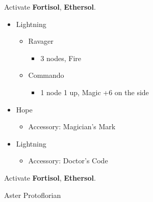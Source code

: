 \begin{paracol}{2}
\begin{menu}
\begin{itemize}
		\end{itemize}
	\end{menu}
	Activate \textbf{Fortisol}, \textbf{Ethersol}.
	\switchcolumn
	\begin{menu}
		\begin{itemize}
			\crystarium
			\begin{itemize}
				\item Lightning
				      \begin{itemize}
					      \item Ravager
					            \begin{itemize}
						            \item 3 nodes, Fire
					            \end{itemize}
					      \item Commando
					            \begin{itemize}
						            \item 1 node 1 up, Magic +6 on the side
					            \end{itemize}
				      \end{itemize}
			\end{itemize}
			\equip
			\begin{itemize}
				\item Hope
				      \begin{itemize}
					      \item Accessory: Magician's Mark
				      \end{itemize}
				\item Lightning
				      \begin{itemize}
					      \item Accessory: Doctor's Code
				      \end{itemize}
			\end{itemize}
		\end{itemize}
	\end{menu}
	Activate \textbf{Fortisol}, \textbf{Ethersol}.
	\switchcolumn*

	\begin{battle}{Aster Protoflorian}


\end{battle}
\end{paracol}
